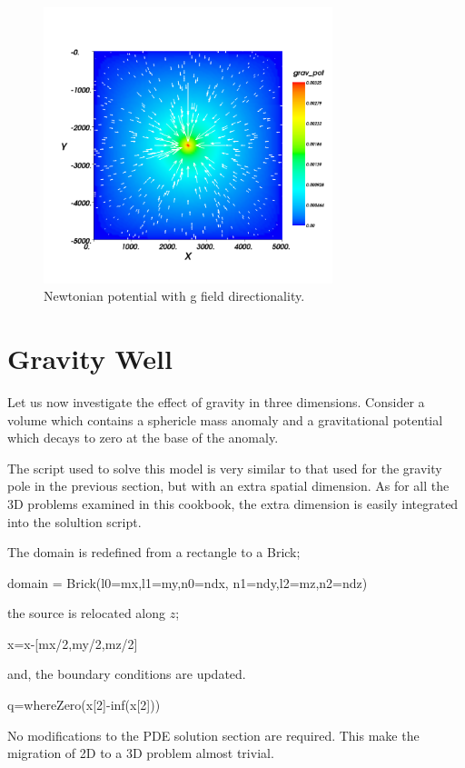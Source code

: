 \begin{figure}[ht]
\centering
\includegraphics[width=0.75\textwidth]{figures/ex10apot.png}
\caption{Newtonian potential with g field directionality.}
\label{fig:ex10pot}
\end{figure}

\section{Gravity Well}
Let us now investigate the effect of gravity in three dimensions. Consider a
volume which contains a sphericle mass anomaly and a gravitational potential
which decays to zero at the base of the anomaly.

The script used to solve this model is very similar to that used for the gravity
pole in the previous section, but with an extra spatial dimension. As for all
the 3D problems examined in this cookbook, the extra dimension is easily
integrated into the \esc solultion script.

The domain is redefined from a rectangle to a Brick;
\begin{python}
domain = Brick(l0=mx,l1=my,n0=ndx, n1=ndy,l2=mz,n2=ndz)
\end{python}
the source is relocated along $z$;
\begin{python}
x=x-[mx/2,my/2,mz/2]
\end{python}
and, the boundary conditions are updated.
\begin{python}
q=whereZero(x[2]-inf(x[2]))
\end{python}
No modifications to the PDE solution section are required. This make the
migration of 2D to a 3D problem almost trivial.

